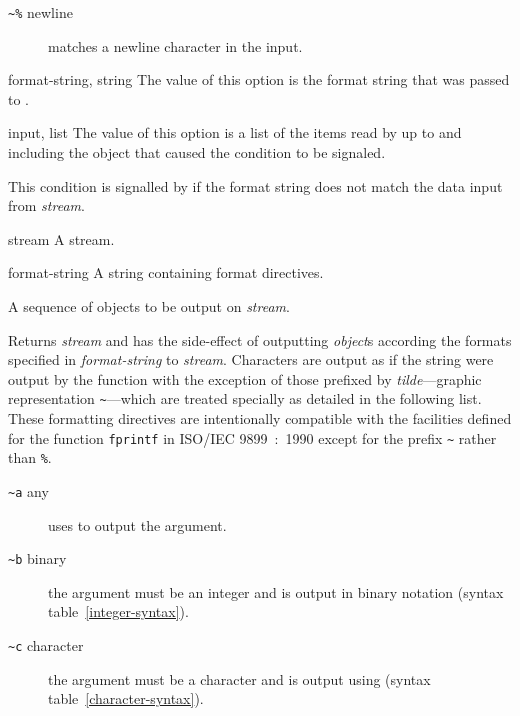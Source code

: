 \begin{optDefinition}
\begin{description}
    \item[{\tt\textasciitilde \%} newline] matches a newline character in the
    input.
\end{description}

%
\begin{initoptions}
    \item[format-string, string] The value of this option is the format string
    that was passed to .
    \item[input, list] The value of this option is a list of the items read by
     up to and including the object that caused the condition
    to be signaled.
\end{initoptions}
%
\remarks%
This condition is signalled by  if the format string does not
match the data input from {\em stream}.

%
\begin{arguments}
    \item[stream] A stream.
    \item[format-string] A string containing format directives.
    \item[\optional{object$_1$ \ldots}] A sequence of objects to be output
    on {\em stream}.
\end{arguments}
%
\result%
Returns {\em stream} and has the side-effect of outputting {\em object\/}s
according the formats specified in {\em format-string} to {\em stream}.
Characters are output as if the string were output by the 
function with the exception of those prefixed by {\em tilde\/}---graphic
representation {\tt\textasciitilde}---which are treated specially as detailed in
the following list.  These formatting directives are intentionally compatible
with the facilities defined for the function {\tt fprintf} in ISO/IEC
9899~:~1990 except for the prefix {\tt\textasciitilde} rather than {\tt\%}.
%
\begin{description}
    \item[{\tt\textasciitilde a} any]%
    uses  to output the argument.

    \item[{\tt\textasciitilde b} binary]%
    the argument must be an integer and is output in binary notation
    (syntax table~\ref{integer-syntax}).

    \item[{\tt\textasciitilde c} character]%
    the argument must be a character and is output using 
    (syntax table~\ref{character-syntax}).


\end{description}
\end{optDefinition}
